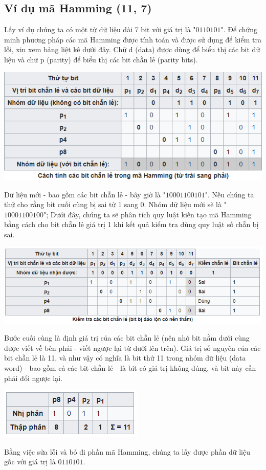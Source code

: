 \documentclass[12pt,a4paper]{article}
\begin{document}
\subsection{Ví dụ mã Hamming (11, 7)}
Lấy ví dụ chúng ta có một từ dữ liệu dài 7 bit với giá trị là "$0110101$". Để chứng minh phương pháp các mã Hamming được tính toán và được sử dụng để kiểm tra lỗi, xin xem bảng liệt kê dưới đây. Chữ d (data) được dùng để biểu thị các bit dữ liệu và chữ p (parity) để biểu thị các bit chẵn lẻ (parity bits).
\begin{center}
\includegraphics[scale=0.8]{bang1.png}
\end{center}
Dữ liệu mới - bao gồm các bit chẵn lẻ - bây giờ là "$10001100101$". Nếu chúng ta thử cho rằng bit cuối cùng bị sai từ 1 sang 0. Nhóm dữ liệu mới sẽ là "$10001100100$"; Dưới đây, chúng ta sẽ phân tích quy luật kiến tạo mã Hamming bằng cách cho bit chẵn lẻ giá trị 1 khi kết quả kiểm tra dùng quy luật số chẵn bị sai.
\begin{center}
\includegraphics[scale=0.8]{bang2.png}
\end{center}
Bước cuối cùng là định giá trị của các bit chẵn lẻ (nên nhớ bit nằm dưới cùng được viết về bên phải - viết ngược lại từ dưới lên trên). Giá trị số nguyên của các bit chẵn lẻ là 11, và như vậy có nghĩa là bit thứ 11 trong nhóm dữ liệu (data word) - bao gồm cả các bit chẵn lẻ - là bit có giá trị không đúng, và bit này cần phải đổi ngược lại.
\begin{center}
\includegraphics[scale=0.8]{bang3.png}
\end{center}
Bằng việc sửa lỗi và bỏ đi phần mã Hamming, chúng ta lấy được phần dữ liệu gốc với giá trị là $0110101$.\\
\end{document}
